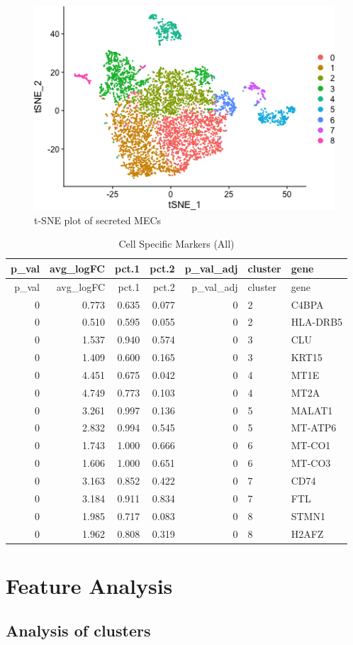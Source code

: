 \documentclass[]{article}
\begin{document}
\begin{figure}
\centering
\includegraphics{figures/tsne-plot-initial-1.png}
\caption{t-SNE plot of secreted MECs}
\end{figure}

\begin{longtable}[]{@{}rrrrrll@{}}
\caption{Cell Specific Markers (All)}\tabularnewline
\toprule
p\_val & avg\_logFC & pct.1 & pct.2 & p\_val\_adj & cluster &
gene\tabularnewline
\midrule
\endfirsthead
\toprule
p\_val & avg\_logFC & pct.1 & pct.2 & p\_val\_adj & cluster &
gene\tabularnewline
\midrule
\endhead
0 & 0.773 & 0.635 & 0.077 & 0 & 2 & C4BPA\tabularnewline
0 & 0.510 & 0.595 & 0.055 & 0 & 2 & HLA-DRB5\tabularnewline
0 & 1.537 & 0.940 & 0.574 & 0 & 3 & CLU\tabularnewline
0 & 1.409 & 0.600 & 0.165 & 0 & 3 & KRT15\tabularnewline
0 & 4.451 & 0.675 & 0.042 & 0 & 4 & MT1E\tabularnewline
0 & 4.749 & 0.773 & 0.103 & 0 & 4 & MT2A\tabularnewline
0 & 3.261 & 0.997 & 0.136 & 0 & 5 & MALAT1\tabularnewline
0 & 2.832 & 0.994 & 0.545 & 0 & 5 & MT-ATP6\tabularnewline
0 & 1.743 & 1.000 & 0.666 & 0 & 6 & MT-CO1\tabularnewline
0 & 1.606 & 1.000 & 0.651 & 0 & 6 & MT-CO3\tabularnewline
0 & 3.163 & 0.852 & 0.422 & 0 & 7 & CD74\tabularnewline
0 & 3.184 & 0.911 & 0.834 & 0 & 7 & FTL\tabularnewline
0 & 1.985 & 0.717 & 0.083 & 0 & 8 & STMN1\tabularnewline
0 & 1.962 & 0.808 & 0.319 & 0 & 8 & H2AFZ\tabularnewline
\bottomrule
\end{longtable}

\hypertarget{feature-analysis}{%
\section{Feature Analysis}\label{feature-analysis}}

\hypertarget{analysis-of-clusters}{%
\subsection{Analysis of clusters}\label{analysis-of-clusters}}
\end{document}
